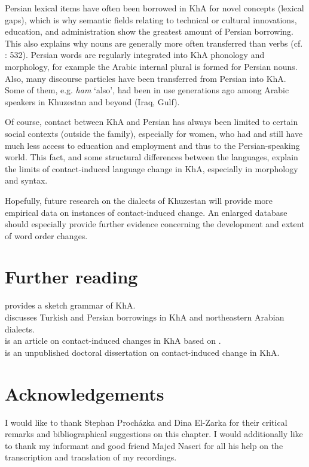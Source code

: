 \documentclass[output=paper,nonflat]{langsci/langscibook}
\begin{document}
Persian lexical items have often been borrowed in KhA for novel concepts (lexical gaps), which is why semantic fields relating to technical or cultural innovations, education, and administration show the greatest amount of Persian borrowing. This also explains why nouns are generally more often transferred than verbs (cf. \citealt{Lucas2015}: 532). Persian words are regularly integrated into KhA phonology and morphology, for example the Arabic internal plural is formed for Persian nouns. Also, many discourse particles have been transferred from Persian into KhA. Some of them, e.g. \textit{ham} ‘also’, had been in use generations ago among Arabic speakers in Khuzestan and beyond (Iraq, Gulf).

Of course, contact between KhA and Persian has always been limited to certain social contexts (outside the family), especially for women, who had and still have much less access to education and employment and thus to the Persian-speaking world. This fact, and some structural differences between the languages, explain the limits of contact-induced language change in KhA, especially in morphology and syntax.

Hopefully, future research on the dialects of Khuzestan will provide more empirical data on instances of contact-induced change. An enlarged database should especially provide further evidence concerning the development and extent of word order changes.

\section*{Further reading}


\citet{Ingham2011khuz} provides a sketch grammar of KhA.\\
\citet{Ingham2005} discusses Turkish and Persian borrowings in KhA and northeastern Arabian dialects.\\
\citet{MatrasShabibi2007} is an article on contact-induced changes in KhA based on \citet{Shabibi2006}.\\
\citet{Shabibi2006} is an unpublished doctoral dissertation on contact-induced change in KhA.



\section*{Acknowledgements}

I would like to thank Stephan Procházka and Dina El-Zarka for their critical remarks and bibliographical suggestions on this chapter. I would additionally like to thank my informant and good friend Majed Naseri for all his help on the transcription and translation of my recordings.
\end{document}
